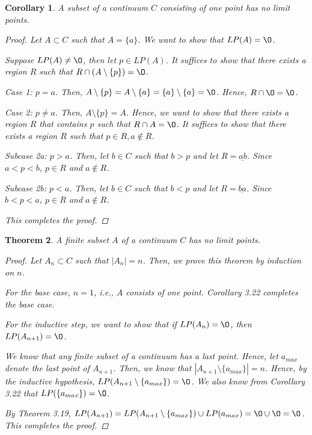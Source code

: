 \documentclass[11pt]{article}
\renewcommand{\emptyset}{\O}
\renewcommand{\_}[1]{\underline{ #1 }}
\newtheorem{theorem}{Theorem}[section]
\newtheorem{corollary}[theorem]{Corollary}
\theoremstyle{definition}
\numberwithin{equation}{subsection}
\begin{document}
\begin{corollary}  A subset of a continuum $C$ consisting of one point has no limit points.

\begin{proof}
Let $A \subset C$ such that $A = \{a\}$. We want to show that $LP(A)=\emptyset$.

Suppose $LP(A) \not= \emptyset$, then let $p \in LP(A)$. It suffices to show that there exists a region $R$ such that $R \cap (A \setminus \{p\}) = \emptyset$.

Case 1: $p = a$. Then, $A \setminus \{p\} = A \setminus \{a\} = \{a\} \setminus \{a\} = \emptyset$. Hence, $R \cap \emptyset = \emptyset$.

Case 2: $p \not= a$. Then, $A \setminus \{p\} = A$. Hence, we want to show that there exists a region $R$ that contains $p$ such that $R \cap A = \emptyset$. It suffices to show that there exists a region $R$ such that $p\in R, a \notin R$.

Subcase 2a: $p>a$. Then, let $b \in C$ such that $b>p$ and let $R = \_{ab}$. Since $a<p<b$, $p \in R$ and $a \notin R$.

Subcase 2b: $p<a$. Then, let $b \in C$ such that $b<p$ and let $R = \_{ba}$. Since $b<p<a$, $p \in R$ and $a \notin R$.

This completes the proof.

\renewcommand\qedsymbol{QED}
\end{proof}
\end{corollary}

\begin{theorem} A finite subset $A$ of a continuum $C$ has no limit points.

\begin{proof}
Let $A_n \subset C$ such that $|A_n|=n$. Then, we prove this theorem by induction on $n$. 

For the base case, $n=1$, i.e., $A$ consists of one point. Corollary 3.22 completes the base case.

For the inductive step, we want to show that if $LP(A_n)= \emptyset$, then $LP(A_{n+1})=\emptyset$.

We know that any finite subset of a continuum has a last point. Hence, let $a_{max}$ denote the last point of $A_{n+1}$. Then, we know that $|A_{n+1} \setminus \{a_{max}\}| = n$. Hence, by the inductive hypothesis, $LP(A_{n+1} \setminus \{a_{max}\}) = \emptyset$. We also know from Corollary 3.22 that $LP(\{a_{max}\}) = \emptyset$.

By Theorem 3.19, $LP(A_{n+1}) = LP(A_{n+1} \setminus \{a_{max}\}) \cup LP(a_{max}) = \emptyset \cup \emptyset = \emptyset$. This completes the proof.

\renewcommand\qedsymbol{QED}
\end{proof}
\end{theorem}
\end{document}
